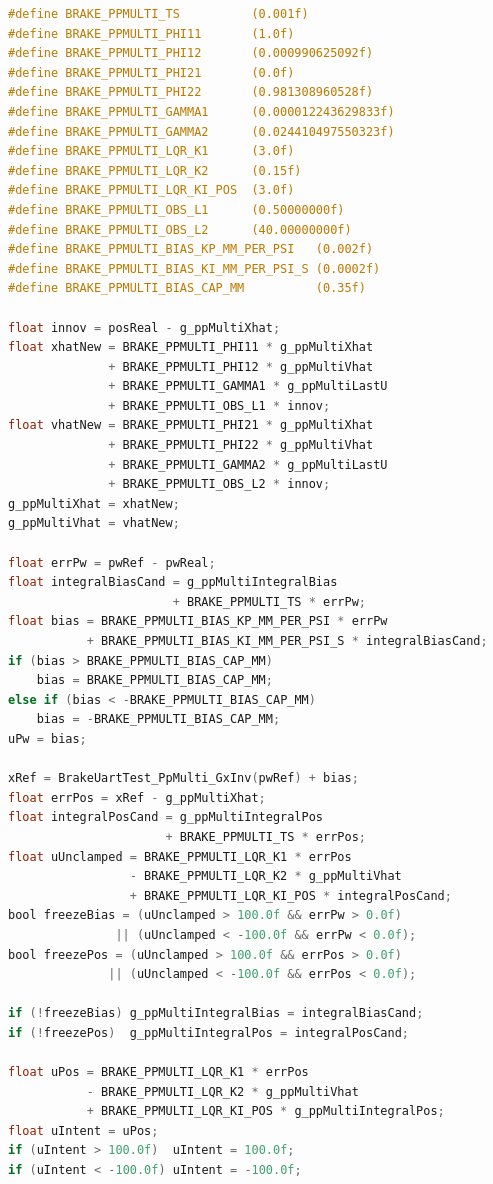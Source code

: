 \begin{lstlisting}[language=C,caption={Modelo discreto, observador e controle LQR com acao integral no ensaio PPMULTI.},label={cod:c-ppmulti-lqi}]
#define BRAKE_PPMULTI_TS          (0.001f)
#define BRAKE_PPMULTI_PHI11       (1.0f)
#define BRAKE_PPMULTI_PHI12       (0.000990625092f)
#define BRAKE_PPMULTI_PHI21       (0.0f)
#define BRAKE_PPMULTI_PHI22       (0.981308960528f)
#define BRAKE_PPMULTI_GAMMA1      (0.000012243629833f)
#define BRAKE_PPMULTI_GAMMA2      (0.024410497550323f)
#define BRAKE_PPMULTI_LQR_K1      (3.0f)
#define BRAKE_PPMULTI_LQR_K2      (0.15f)
#define BRAKE_PPMULTI_LQR_KI_POS  (3.0f)
#define BRAKE_PPMULTI_OBS_L1      (0.50000000f)
#define BRAKE_PPMULTI_OBS_L2      (40.00000000f)
#define BRAKE_PPMULTI_BIAS_KP_MM_PER_PSI   (0.002f)
#define BRAKE_PPMULTI_BIAS_KI_MM_PER_PSI_S (0.0002f)
#define BRAKE_PPMULTI_BIAS_CAP_MM          (0.35f)

float innov = posReal - g_ppMultiXhat;
float xhatNew = BRAKE_PPMULTI_PHI11 * g_ppMultiXhat
              + BRAKE_PPMULTI_PHI12 * g_ppMultiVhat
              + BRAKE_PPMULTI_GAMMA1 * g_ppMultiLastU
              + BRAKE_PPMULTI_OBS_L1 * innov;
float vhatNew = BRAKE_PPMULTI_PHI21 * g_ppMultiXhat
              + BRAKE_PPMULTI_PHI22 * g_ppMultiVhat
              + BRAKE_PPMULTI_GAMMA2 * g_ppMultiLastU
              + BRAKE_PPMULTI_OBS_L2 * innov;
g_ppMultiXhat = xhatNew;
g_ppMultiVhat = vhatNew;

float errPw = pwRef - pwReal;
float integralBiasCand = g_ppMultiIntegralBias
                       + BRAKE_PPMULTI_TS * errPw;
float bias = BRAKE_PPMULTI_BIAS_KP_MM_PER_PSI * errPw
           + BRAKE_PPMULTI_BIAS_KI_MM_PER_PSI_S * integralBiasCand;
if (bias > BRAKE_PPMULTI_BIAS_CAP_MM)
    bias = BRAKE_PPMULTI_BIAS_CAP_MM;
else if (bias < -BRAKE_PPMULTI_BIAS_CAP_MM)
    bias = -BRAKE_PPMULTI_BIAS_CAP_MM;
uPw = bias;

xRef = BrakeUartTest_PpMulti_GxInv(pwRef) + bias;
float errPos = xRef - g_ppMultiXhat;
float integralPosCand = g_ppMultiIntegralPos
                      + BRAKE_PPMULTI_TS * errPos;
float uUnclamped = BRAKE_PPMULTI_LQR_K1 * errPos
                 - BRAKE_PPMULTI_LQR_K2 * g_ppMultiVhat
                 + BRAKE_PPMULTI_LQR_KI_POS * integralPosCand;
bool freezeBias = (uUnclamped > 100.0f && errPw > 0.0f)
               || (uUnclamped < -100.0f && errPw < 0.0f);
bool freezePos = (uUnclamped > 100.0f && errPos > 0.0f)
              || (uUnclamped < -100.0f && errPos < 0.0f);

if (!freezeBias) g_ppMultiIntegralBias = integralBiasCand;
if (!freezePos)  g_ppMultiIntegralPos = integralPosCand;

float uPos = BRAKE_PPMULTI_LQR_K1 * errPos
           - BRAKE_PPMULTI_LQR_K2 * g_ppMultiVhat
           + BRAKE_PPMULTI_LQR_KI_POS * g_ppMultiIntegralPos;
float uIntent = uPos;
if (uIntent > 100.0f)  uIntent = 100.0f;
if (uIntent < -100.0f) uIntent = -100.0f;
\end{lstlisting}

